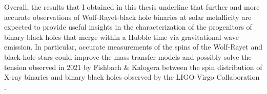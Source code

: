 \documentclass[a4paper,titlepage]{book}     	%
\begin{document}
Overall, the results that I obtained in this thesis underline that further and more accurate observations of Wolf-Rayet-black hole binaries at solar metallicity are expected to provide useful insights in the characterization of the progenitors of binary black holes that merge within a Hubble time via gravitational wave emission. In particular, accurate measurements of the spins of the Wolf-Rayet and black hole stars could improve the mass transfer models and possibly solve the tension observed in 2021 by Fishbach \& Kalogera between the spin distribution of X-ray binaries and binary black holes observed by the LIGO-Virgo Collaboration \cite{HMXBH_spins2021}.
\end{document}
